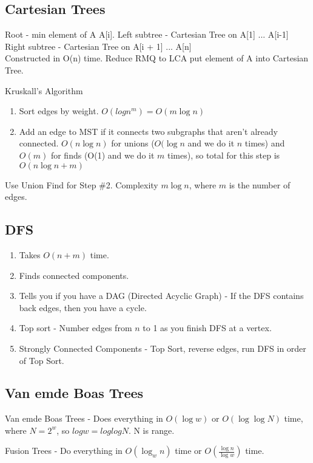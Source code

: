\documentclass[10pt,twocolumn]{article}
\begin{document}
\subsection{Cartesian Trees}
Root - min element of A A[i].  Left subtree - Cartesian Tree on A[1] ... A[i-1]
Right subtree - Cartesian Tree on A[i + 1] ... A[n]\\
Constructed in O(n) time.
Reduce RMQ to LCA put element of A into Cartesian Tree.



Kruskall's Algorithm
\begin{enumerate}
    \item Sort edges by weight. $O(logn^m) = O(m\log{n})$
    \item Add an edge to MST if it connects two subgraphs that aren't already connected. $O(n\log{n})$ for
        unions ($O(\log{n}$ and we do it $n$ times) and $O(m)$ for finds (O(1) and we do it $m$ times), so total for this step is $O(n\log{n}+m)$
\end{enumerate}

Use Union Find for Step \#2. Complexity $m \log n$, where $m$ is the number of edges.

\subsection{DFS}
\begin{enumerate}
    \item Takes $O(n+m)$ time.
    \item Finds connected components.
    \item Tells you if you have a DAG (Directed Acyclic Graph) - If the DFS contains back edges, then you have a cycle.
    \item Top sort - Number edges from $n$ to 1 as you finish DFS at a vertex.
    \item Strongly Connected Components - Top Sort, reverse edges, run DFS in order of Top Sort.
\end{enumerate}

\subsection{Van emde Boas Trees}

Van emde Boas Trees - Does everything in $O(\log w)$ or $O(\log \log N)$ time,
where $N = 2^w$, so $logw = loglogN$. N is range.

Fusion Trees - Do everything in $O(\log_{w}{n})$ time or $O(\frac{\log{n}}{\log{w}})$ time.
\end{document}
